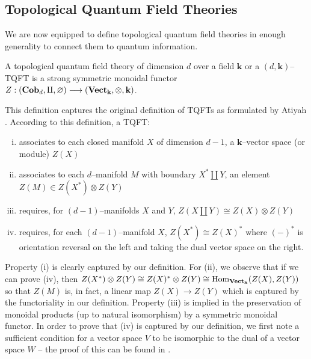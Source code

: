 
\subsection{Topological Quantum Field Theories}

We are now equipped to define topological quantum field theories in enough
generality to connect them to quantum information.

\begin{defn}
A topological quantum field theory of dimension $d$ over a field $\mathbf{k}$
or a $(d, \mathbf{k})$--TQFT is a strong symmetric monoidal functor
$Z : (\textbf{Cob}_d, \amalg, \varnothing) \stackrel{}{\longrightarrow} (\textbf{Vect}_{\mathbf{k}}, \otimes, \mathbf{k})$.
\end{defn}

This definition captures the original definition of TQFTs as formulated by
Atiyah \cite{Atiyah1}. According to this definition, a TQFT:
\begin{enumerate}[(i)]
\item associates to each closed manifold $X$ of dimension $d - 1$, a
$\mathbf{k}$--vector space (or module) $Z(X)$

\item associates to each $d$--manifold $M$ with boundary $X^* \amalg Y$, an
element $Z(M) \in Z(X^*) \otimes Z(Y)$

\item requires, for $(d - 1)$--manifolds $X$ and $Y$,
$Z(X \amalg Y) \cong Z(X) \otimes Z(Y)$

\item requires, for each $(d - 1)$--manifold $X$, $Z(X^*) \cong Z(X)^*$ where
$(-)^*$ is orientation reversal on the left and taking the dual vector space on
the right.
\end{enumerate}

Property (i) is clearly captured by our definition. For (ii), we observe that if
we can prove (iv), then $Z(X^*) \otimes Z(Y) \cong Z(X)^* \otimes Z(Y) \cong
\text{Hom}_{\textbf{Vect}_{\mathbf{k}}}(Z(X), Z(Y))$ so that $Z(M)$ is, in fact, a linear map
$Z(X) \to Z(Y)$ which is captured by the functoriality in our definition.
Property (iii) is implied in the preservation of monoidal products (up to
natural isomorphism) by a symmetric monoidal functor. In order to prove that
(iv) is captured by our definition, we first note a sufficient condition for a
vector space $V$ to be isomorphic to the dual of a vector space $W$ -- the proof
of this can be found in \cite{Corominas}.

